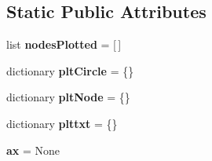 \subsection*{Static Public Attributes}
\begin{DoxyCompactItemize}
\item 
\hypertarget{classmininet_1_1wifiPlot_1_1plot_a55efe84a502db8a56969c35a58d6f212}{list {\bfseries nodes\-Plotted} = \mbox{[}$\,$\mbox{]}}\label{classmininet_1_1wifiPlot_1_1plot_a55efe84a502db8a56969c35a58d6f212}

\item 
\hypertarget{classmininet_1_1wifiPlot_1_1plot_aba5c7af14e7f8b749e4dae705078404c}{dictionary {\bfseries plt\-Circle} = \{\}}\label{classmininet_1_1wifiPlot_1_1plot_aba5c7af14e7f8b749e4dae705078404c}

\item 
\hypertarget{classmininet_1_1wifiPlot_1_1plot_a1c6d625353e15d07983b866c99386cd2}{dictionary {\bfseries plt\-Node} = \{\}}\label{classmininet_1_1wifiPlot_1_1plot_a1c6d625353e15d07983b866c99386cd2}

\item 
\hypertarget{classmininet_1_1wifiPlot_1_1plot_a64ba0df28f6fe244612bba36ac5b6cc0}{dictionary {\bfseries plttxt} = \{\}}\label{classmininet_1_1wifiPlot_1_1plot_a64ba0df28f6fe244612bba36ac5b6cc0}

\item 
\hypertarget{classmininet_1_1wifiPlot_1_1plot_a0ee7829b93a5f88edfc4d57a639fdaec}{{\bfseries ax} = None}\label{classmininet_1_1wifiPlot_1_1plot_a0ee7829b93a5f88edfc4d57a639fdaec}

\end{DoxyCompactItemize}



